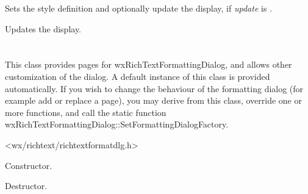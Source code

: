 Sets the style definition and optionally update the display, if {\it update} is \true.

\label{wxrichtextformattingdialogupdatedisplay}


Updates the display.


%
%


\section{}\label{wxrichtextformattingdialogfactory}

This class provides pages for wxRichTextFormattingDialog, and allows other customization of the dialog.
A default instance of this class is provided automatically. If you wish to change the behaviour of the
formatting dialog (for example add or replace a page), you may derive from this class,
override one or more functions, and call the static function wxRichTextFormattingDialog::SetFormattingDialogFactory.
 



<wx/richtext/richtextformatdlg.h>





\label{wxrichtextformattingdialogfactorywxrichtextformattingdialogfactory}


Constructor.

\label{wxrichtextformattingdialogfactorydtor}


Destructor.

\label{wxrichtextformattingdialogfactorycreatebuttons}

